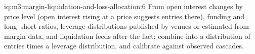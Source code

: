 \begin{solution}{iq:m3:margin-liquidation-and-loss-allocation:6}
From open interest changes by price level (open interest rising at a price suggests entries there), funding and long--short
ratios, leverage distributions published by venues or estimated from margin data, and liquidation feeds after the fact; combine
into a distribution of entries times a leverage distribution, and calibrate against observed cascades.
\end{solution}

